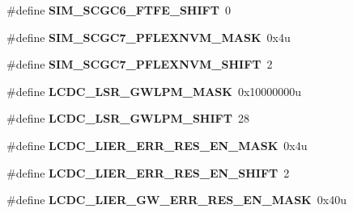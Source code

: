 \begin{DoxyCompactItemize}
\item 
\hypertarget{group___backward___compatibility___symbols_ga930a9387f73c588ace6a2880decfc198}{}\#define {\bfseries S\+I\+M\+\_\+\+S\+C\+G\+C6\+\_\+\+F\+T\+F\+E\+\_\+\+S\+H\+I\+F\+T}~0\label{group___backward___compatibility___symbols_ga930a9387f73c588ace6a2880decfc198}

\item 
\hypertarget{group___backward___compatibility___symbols_ga81c2b93ef26aa761b41616aefd94f95a}{}\#define {\bfseries S\+I\+M\+\_\+\+S\+C\+G\+C7\+\_\+\+P\+F\+L\+E\+X\+N\+V\+M\+\_\+\+M\+A\+S\+K}~0x4u\label{group___backward___compatibility___symbols_ga81c2b93ef26aa761b41616aefd94f95a}

\item 
\hypertarget{group___backward___compatibility___symbols_ga0b5898b6d52bb5469a59dd7360d030d7}{}\#define {\bfseries S\+I\+M\+\_\+\+S\+C\+G\+C7\+\_\+\+P\+F\+L\+E\+X\+N\+V\+M\+\_\+\+S\+H\+I\+F\+T}~2\label{group___backward___compatibility___symbols_ga0b5898b6d52bb5469a59dd7360d030d7}

\item 
\hypertarget{group___backward___compatibility___symbols_ga409a053fbaebb4e1257f7adc8c897e4f}{}\#define {\bfseries L\+C\+D\+C\+\_\+\+L\+S\+R\+\_\+\+G\+W\+L\+P\+M\+\_\+\+M\+A\+S\+K}~0x10000000u\label{group___backward___compatibility___symbols_ga409a053fbaebb4e1257f7adc8c897e4f}

\item 
\hypertarget{group___backward___compatibility___symbols_ga74218b4771f87f815ede1fe7968dde82}{}\#define {\bfseries L\+C\+D\+C\+\_\+\+L\+S\+R\+\_\+\+G\+W\+L\+P\+M\+\_\+\+S\+H\+I\+F\+T}~28\label{group___backward___compatibility___symbols_ga74218b4771f87f815ede1fe7968dde82}

\item 
\hypertarget{group___backward___compatibility___symbols_gad49e28a1c4b712d533afe73c035d227b}{}\#define {\bfseries L\+C\+D\+C\+\_\+\+L\+I\+E\+R\+\_\+\+E\+R\+R\+\_\+\+R\+E\+S\+\_\+\+E\+N\+\_\+\+M\+A\+S\+K}~0x4u\label{group___backward___compatibility___symbols_gad49e28a1c4b712d533afe73c035d227b}

\item 
\hypertarget{group___backward___compatibility___symbols_gad6e04ccec4f221633ec9dedddcd4f53a}{}\#define {\bfseries L\+C\+D\+C\+\_\+\+L\+I\+E\+R\+\_\+\+E\+R\+R\+\_\+\+R\+E\+S\+\_\+\+E\+N\+\_\+\+S\+H\+I\+F\+T}~2\label{group___backward___compatibility___symbols_gad6e04ccec4f221633ec9dedddcd4f53a}

\item 
\hypertarget{group___backward___compatibility___symbols_ga46e568af684b3fd467f42d3e7fdfbbdd}{}\#define {\bfseries L\+C\+D\+C\+\_\+\+L\+I\+E\+R\+\_\+\+G\+W\+\_\+\+E\+R\+R\+\_\+\+R\+E\+S\+\_\+\+E\+N\+\_\+\+M\+A\+S\+K}~0x40u\label{group___backward___compatibility___symbols_ga46e568af684b3fd467f42d3e7fdfbbdd}


\end{DoxyCompactItemize}
